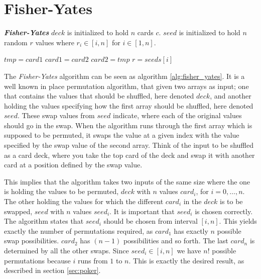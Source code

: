 \documentclass[twoside,11pt,openright]{report}
\newcommand{\FY}{\textit{Fisher-Yates} }
\begin{document}
\section{Fisher-Yates}
\label{sec:fisher-yates}

\begin{algorithm}[t]
\caption{\textbf{\textit{Fisher-Yates}} \newline
    $deck$ is initialized to hold $n$ cards $c$. \newline
    $seed$ is initialized to hold $n$ random $r$ values where $r_i\in[i,n]$ for $i\in [1,n]$.
}
\label{alg:fisher_yates}

\begin{algorithmic}[t]
\State $tmp = card1$
\State $card1 = card2$
\State $card2 = tmp$
\EndFunction
\State
{}
\State $r = seeds[i]$
\State {}
\EndFor
\EndFunction
\end{algorithmic}
\end{algorithm}

The \FY algorithm can be seen as algorithm \ref{alg:fisher_yates}. It is a well known in place permutation algorithm, that given two arrays as input; one that contains the values that should be shuffled, here denoted $deck$, and another holding the values specifying how the first array should be shuffled, here denoted $seed$. These swap values from $seed$ indicate, where each of the original values should go in the swap. When the algorithm runs through the first array which is supposed to be permuted, it swaps the value at a given index with the value specified by the swap value of the second array. Think of the input to be shuffled as a card deck, where you take the top card of the deck and swap it with another card at a position defined by the swap value.

This implies that the algorithm takes two inputs of the same size where the one is holding the values to be permuted, $deck$ with $n$ values $card_i$, for $i=0,\dots,n$. The other holding the values for which the different $card_i$ in the $deck$ is to be swapped, $seed$ with $n$ values $seed_i$. It is important that $seed_i$ is chosen correctly. The algorithm states that $seed_i$ should be chosen from interval $[i,n]$. This yields exactly the number of permutations required, as $card_1$ has exactly $n$ possible swap possibilities. $card_2$ has $(n-1)$ possibilities and so forth. The last $card_n$ is determined by all the other swaps. Since $seed_i\in[i,n]$ we have $n!$ possible permutations because $i$ runs from $1$ to $n$. This is exactly the desired result, as described in section \ref{sec:poker}.
\end{document}
